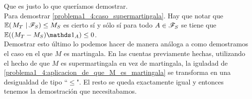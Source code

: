 	Que es justo lo que queríamos demostrar.\\
	
	Para demostrar \eqref{problema1_4:caso_supermartingala}. Hay que notar que $ \espc{M_T}{\F_S}\leq M_S $ es cierto sí y sólo sí para todo $A \in \mathscr{F}_S$
	se tiene que $ \E((M_T - M_S) \indic_{A}) \leq 0 $.\\
	
	Demostrar esto último lo podemos hacer de manera análoga a como demostramos el caso en el que $M$ es martingala. En las cuentas previamente hechas,
	utilizando el hecho de que $M$ es supermartingala en vez de martingala, la iguladad de \eqref{problema1_4:aplicacion_de_que_M_es_martingala} 
	se transforma en una desigualdad de tipo ``$\leq$". El resto se queda exactamente igual y entonces tenemos la demostración que necesitabamos.
	
	
	